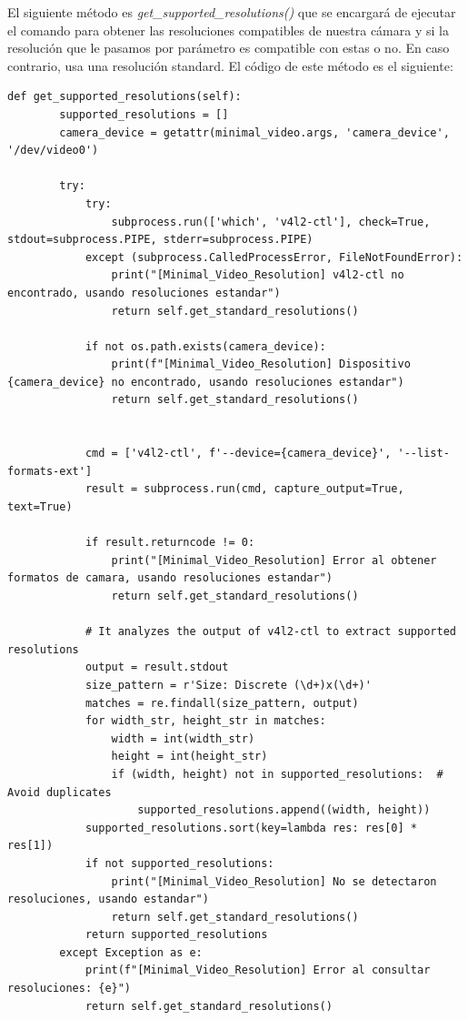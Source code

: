El siguiente método es \textit{get\_supported\_resolutions()} que se encargará de ejecutar el comando para obtener las resoluciones compatibles de nuestra cámara y si la resolución que le pasamos por parámetro es compatible con estas o no. En caso contrario, usa una resolución standard. El código de este método es el siguiente:
\begin{lstlisting}[style=pythonstyle, caption={Método get\_supported\_resolutions() de \textit{Minimal\_Video\_Resolution}}, label={lst:get_supported_resolution_minimal_video_resolution}]
def get_supported_resolutions(self):
        supported_resolutions = []
        camera_device = getattr(minimal_video.args, 'camera_device', '/dev/video0')
        
        try:
            try:
                subprocess.run(['which', 'v4l2-ctl'], check=True, stdout=subprocess.PIPE, stderr=subprocess.PIPE)
            except (subprocess.CalledProcessError, FileNotFoundError):
                print("[Minimal_Video_Resolution] v4l2-ctl no encontrado, usando resoluciones estandar")
                return self.get_standard_resolutions()
                
            if not os.path.exists(camera_device):
                print(f"[Minimal_Video_Resolution] Dispositivo {camera_device} no encontrado, usando resoluciones estandar")
                return self.get_standard_resolutions()
            
            
            cmd = ['v4l2-ctl', f'--device={camera_device}', '--list-formats-ext']
            result = subprocess.run(cmd, capture_output=True, text=True)
            
            if result.returncode != 0:
                print("[Minimal_Video_Resolution] Error al obtener formatos de camara, usando resoluciones estandar")
                return self.get_standard_resolutions()
            
            # It analyzes the output of v4l2-ctl to extract supported resolutions
            output = result.stdout
            size_pattern = r'Size: Discrete (\d+)x(\d+)'
            matches = re.findall(size_pattern, output)
            for width_str, height_str in matches:
                width = int(width_str)
                height = int(height_str)
                if (width, height) not in supported_resolutions:  # Avoid duplicates
                    supported_resolutions.append((width, height))
            supported_resolutions.sort(key=lambda res: res[0] * res[1])
            if not supported_resolutions:
                print("[Minimal_Video_Resolution] No se detectaron resoluciones, usando estandar")
                return self.get_standard_resolutions()
            return supported_resolutions
        except Exception as e:
            print(f"[Minimal_Video_Resolution] Error al consultar resoluciones: {e}")
            return self.get_standard_resolutions()
\end{lstlisting}
\vspace{\baselineskip}

